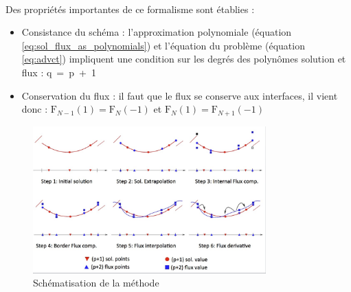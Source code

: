     \paragraph{}
    Des propriétés importantes de ce formalisme sont établies : 
    \begin{itemize}[label=\textbullet]
           \item Consistance du schéma : l'approximation polynomiale (équation \ref{eq:sol_flux_as_polynomials}) et l'équation du problème (équation \ref{eq:advct}) impliquent une condition sur les degrés des polynômes solution et flux : q~=~p~+~1
           \item Conservation du flux : il faut que le flux se conserve aux interfaces, il vient donc : $\mathrm{F}_{N-1}(1)=\mathrm{F}_{N}(-1)$ et $\mathrm{F}_{N}(1)=\mathrm{F}_{N+1}(-1)$
    \end{itemize}
    \begin{figure}
        \centering
        \includegraphics[width=0.8\textwidth]{images/Meth_spectrale.jpg}
          \caption{Schématisation de la méthode} 
    \label{fig:meth_spectrale}
    \end{figure}
